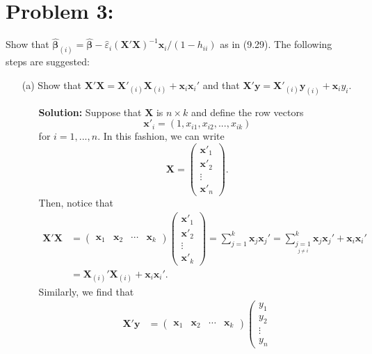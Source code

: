 \documentclass[11pt]{article}
\begin{document}
\section*{Problem 3:}
Show that $\widehat{\bm\beta}_{(i)} = \widehat{\bm\beta} - \widehat{\varepsilon}_i(\mathbf{X}'\mathbf{X}
)^{-1}\mathbf{x}_i/(1-h_{ii})$ as in (9.29).  The following steps are suggested:
\begin{itemize}
\item[(a)] Show that $\mathbf{X}'\mathbf{X} = \mathbf{X}'_{(i)}\mathbf{X}_{(i)} + \mathbf{x}_i\mathbf{x}_i'$ and that $\mathbf{X}'\mathbf{y} = \mathbf{X}'_{(i)}\mathbf{y}_{(i)} + \mathbf{x}_iy_i$.
\begin{itemize}
\item[] \textbf{Solution:}  Suppose that $\mathbf{X}$ is $n\times k$ and define the row vectors
\[
\mathbf{x}'_{i} = (1,x_{i1},x_{i2},...,x_{ik})
\]
for $i=1,...,n$.  In this fashion, we can write
\[
\mathbf{X} = \left(\begin{matrix}
\mathbf{x}'_1 \\ \mathbf{x}'_2 \\ \vdots \\ \mathbf{x}'_n
\end{matrix}\right).
\]
Then, notice that
\begin{align*}
\mathbf{X}'\mathbf{X} &= \left(\begin{matrix}
\mathbf{x}_1 & \mathbf{x}_2 & \cdots & \mathbf{x}_k
\end{matrix}\right)\left(\begin{matrix}
\mathbf{x}'_1 \\ \mathbf{x}'_2 \\ \vdots \\ \mathbf{x}'_k
\end{matrix}\right) = \sum_{j=1}^k \mathbf{x}_j\mathbf{x}_j' = \sum_{\underset{j\not= i}{j=1}}^k \mathbf{x}_j\mathbf{x}_j' + \mathbf{x}_i\mathbf{x}_i' \\
&= \mathbf{X}_{(i)}'\mathbf{X}_{(i)} + \mathbf{x}_i\mathbf{x}_i'.
\end{align*}
Similarly, we find that
\begin{align*}
\mathbf{X}'\mathbf{y} &= \left(\begin{matrix}
\mathbf{x}_1 & \mathbf{x}_2 & \cdots & \mathbf{x}_k
\end{matrix}\right) \left(\begin{matrix}
y_1 \\ y_2 \\ \vdots \\ y_n

\end{matrix}
\end{align*}
\end{itemize}
\end{itemize}
\end{document}
